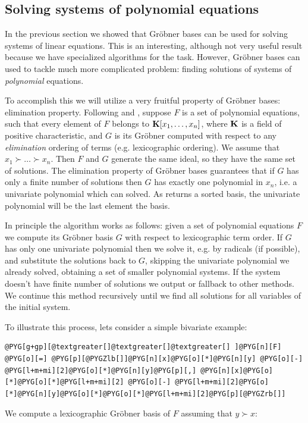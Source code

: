 \subsection{Solving systems of polynomial equations}

In the previous section we showed that Gröbner bases can be used for solving systems
of linear equations. This is an interesting, although not very useful result because we
have specialized algorithms for the task. However, Gröbner bases can used to tackle
much more complicated problem: finding solutions of systems of \emph{polynomial} equations.

To accomplish this we will utilize a very fruitful property of Gröbner bases: elimination
property. Following \cite{Buchberger2001systems} and \cite{Adams1994intro}, suppose $F$ is a set of
polynomial equations, such that every element of $F$ belongs to $\mathbf{K}[x_1, \ldots, x_n]$, where $\mathbf{K}$ is a field
of positive characteristic, and $G$ is its Gröbner computed with respect to any \emph{elimination}
ordering of terms (e.g. lexicographic ordering). We assume that $x_1 \succ \ldots \succ x_n$. Then
$F$ and $G$ generate the same ideal, so they have the same set of solutions. The elimination property
of Gröbner bases guarantees that if $G$ has only a finite number of solutions then $G$ has exactly
one polynomial in $x_n$, i.e. a univariate polynomial which can solved. As  returns
a sorted basis, the univariate polynomial will be the last element the basis.

In principle the algorithm works as follows: given a set of polynomial equations $F$ we compute
its Gröbner basis $G$ with respect to lexicographic term order. If $G$ has only one univariate
polynomial then we solve it, e.g. by radicals (if possible), and substitute the solutions back to
$G$, skipping the univariate polynomial we already solved, obtaining a set of smaller polynomial
systems. If the system doesn't have finite number of solutions we output  or fallback
to other methods. We continue this method recursively until we find all solutions for all variables
of the initial system.

To illustrate this process, lets consider a simple bivariate example:

\begin{Verbatim}[commandchars=@\[\]]
@PYG[g+gp][@textgreater[]@textgreater[]@textgreater[] ]@PYG[n][F] @PYG[o][=] @PYG[p][@PYGZlb[]]@PYG[n][x]@PYG[o][*]@PYG[n][y] @PYG[o][-] @PYG[l+m+mi][2]@PYG[o][*]@PYG[n][y]@PYG[p][,] @PYG[n][x]@PYG[o][*]@PYG[o][*]@PYG[l+m+mi][2] @PYG[o][-] @PYG[l+m+mi][2]@PYG[o][*]@PYG[n][y]@PYG[o][*]@PYG[o][*]@PYG[l+m+mi][2]@PYG[p][@PYGZrb[]]
\end{Verbatim}
\noindent
We compute a lexicographic Gröbner basis of $F$ assuming that $y \succ x$:

